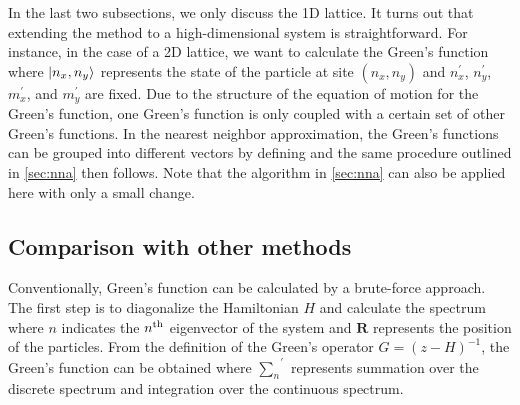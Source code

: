 In the last two subsections, we only discuss the 1D lattice. It turns out that extending the method to a high-dimensional system is 
straightforward. For instance, in the case of a 2D lattice, we 
want to calculate the Green's function 
where $| n_x, n_y \rangle$ represents the state of the particle at site $(n_x, n_y)$ and $n_x^{\prime}$, $n_y^{\prime}$,
$m_x^{\prime}$, and $m_y^{\prime}$ are fixed. Due to the structure of the equation of  
motion for the Green's function, one Green's function is only coupled with a certain set of other Green's functions. In the
nearest neighbor approximation, the Green's functions can be grouped into different vectors by defining
and  the same procedure outlined in \autoref{sec:nna} then follows. Note that the algorithm in \autoref{sec:nna} can also
be applied here with only a small change.  

\subsection{Comparison with other methods}
\label{sec:comparison}

Conventionally, Green's function can be calculated by a brute-force approach. The first step is to diagonalize the 
Hamiltonian $H$ and calculate the spectrum
where $n$ indicates the $n^{\rm th}$ eigenvector of the system and $\mathbf{R}$ represents the position of the
particles. From the definition of the Green's operator $\hat{G} = (z-H)^{-1}$,  the Green's function
can be obtained
where ${\sum_{n}}^{\prime}$ represents  summation over the discrete spectrum and  integration over the
 continuous spectrum. 

